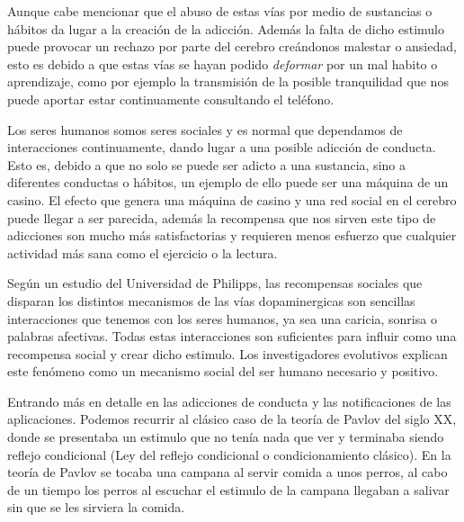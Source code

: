 \vspace{0.3cm}

Aunque cabe mencionar que el abuso de estas vías por medio de sustancias o hábitos da lugar a la creación de la adicción. Además la falta de dicho estimulo puede provocar un rechazo por parte del cerebro creándonos malestar o ansiedad, esto es debido a que estas vías se hayan podido \textit{deformar} por un mal habito o aprendizaje, como por ejemplo la transmisión de la posible tranquilidad que nos puede aportar estar continuamente consultando el teléfono.

\vspace{0.3cm}

Los seres humanos somos seres sociales y es normal que dependamos de interacciones continuamente, dando lugar a una posible adicción de conducta. Esto es, debido a que no solo se puede ser adicto a una sustancia, sino a diferentes conductas o hábitos, un ejemplo de ello puede ser una máquina de un casino. El efecto que genera una máquina de casino y una red social en el cerebro puede llegar a ser parecida, además la recompensa que nos sirven este tipo de adicciones son mucho más satisfactorias y requieren menos esfuerzo que cualquier actividad más sana como el ejercicio o la lectura. \cite{quintero2021que}

\vspace{0.3cm}

Según un estudio del Universidad de Philipps, las recompensas sociales que disparan los distintos mecanismos de las vías dopaminergicas son sencillas interacciones que tenemos con los seres humanos, ya sea una caricia, sonrisa o palabras afectivas. Todas estas interacciones son suficientes para influir como una recompensa social y crear dicho estimulo. Los investigadores evolutivos explican este fenómeno como un mecanismo social del ser humano necesario y positivo. \cite{Frontiers-RRSS-AS}

\vspace{0.3cm}

Entrando más en detalle en las adicciones de conducta y las notificaciones de las aplicaciones. Podemos recurrir al clásico caso de la teoría de Pavlov del siglo XX, donde se presentaba un estimulo que no tenía nada que ver y terminaba siendo reflejo condicional (Ley del reflejo condicional o condicionamiento clásico). En la teoría de Pavlov se tocaba una campana al servir comida a unos perros, al cabo de un tiempo los perros al escuchar el estimulo de la campana llegaban a salivar sin que se les sirviera la comida. \cite{Pavlov-RRSS-AS}

